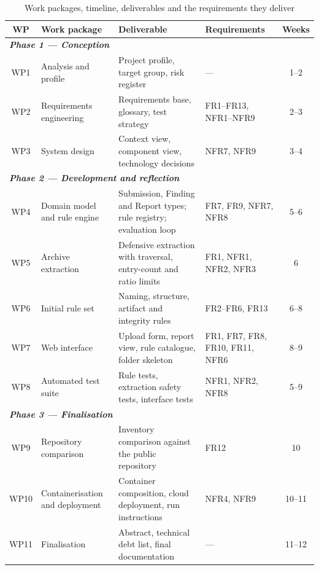 \documentclass[a4paper,11pt]{article}
\begin{document}
\begin{table}[H]
\centering
\caption{Work packages, timeline, deliverables and the requirements they deliver}
\label{tab:workpackages}
\footnotesize
\renewcommand{\arraystretch}{1.2}
\setlength{\tabcolsep}{4pt}
\begin{tabularx}{\textwidth}{|c|p{3.0cm}|X|p{2.4cm}|c|}
\hline
\rowcolor{gray!15}
\textbf{WP} & \textbf{Work package} & \textbf{Deliverable} & \textbf{Requirements} & \textbf{Weeks} \\
\hline
\hline
\multicolumn{5}{|l|}{\cellcolor{blue!8}\textit{\textbf{Phase 1 --- Conception}}} \\
\hline
WP1 & Analysis and profile & Project profile, target group, risk register & --- & 1--2 \\
\hline
WP2 & Requirements engineering & Requirements base, glossary, test strategy & FR1--FR13, NFR1--NFR9 & 2--3 \\
\hline
WP3 & System design & Context view, component view, technology decisions & NFR7, NFR9 & 3--4 \\
\hline
\hline
\multicolumn{5}{|l|}{\cellcolor{blue!8}\textit{\textbf{Phase 2 --- Development and reflection}}} \\
\hline
WP4 & Domain model and rule engine & Submission, Finding and Report types; rule registry; evaluation loop & FR7, FR9, NFR7, NFR8 & 5--6 \\
\hline
WP5 & Archive extraction & Defensive extraction with traversal, entry-count and ratio limits & FR1, NFR1, NFR2, NFR3 & 6 \\
\hline
WP6 & Initial rule set & Naming, structure, artifact and integrity rules & FR2--FR6, FR13 & 6--8 \\
\hline
WP7 & Web interface & Upload form, report view, rule catalogue, folder skeleton & FR1, FR7, FR8, FR10, FR11, NFR6 & 8--9 \\
\hline
WP8 & Automated test suite & Rule tests, extraction safety tests, interface tests & NFR1, NFR2, NFR8 & 5--9 \\
\hline
\hline
\multicolumn{5}{|l|}{\cellcolor{blue!8}\textit{\textbf{Phase 3 --- Finalisation}}} \\
\hline
WP9 & Repository comparison & Inventory comparison against the public repository & FR12 & 10 \\
\hline
WP10 & Containerisation and deployment & Container composition, cloud deployment, run instructions & NFR4, NFR9 & 10--11 \\
\hline
WP11 & Finalisation & Abstract, technical debt list, final documentation & --- & 11--12 \\
\hline
\end{tabularx}
\end{table}
\end{document}
